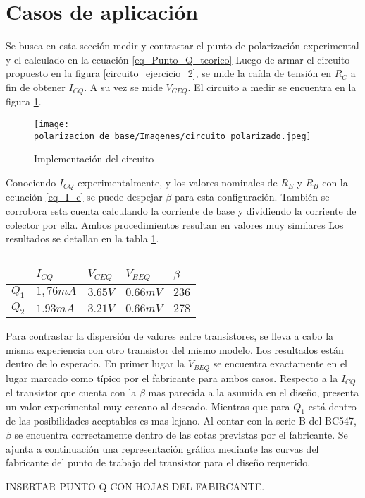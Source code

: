 \section{Casos de aplicación}

Se busca en esta sección medir y contrastar el punto de polarización experimental y el calculado en la ecuación \ref{eq_Punto_Q_teorico}
Luego de armar el circuito propuesto en la figura \ref{circuito_ejercicio_2}, se mide la caída de tensión en $R_C$ a fin de obtener $I_{CQ}$. A su vez se mide $V_{CEQ}$. El circuito a medir se encuentra en la figura \ref{fig_circuito_fisico}.
\begin{figure}[ht]
    \centering
    \texttt{[image: polarizacion\_de\_base/Imagenes/circuito\_polarizado.jpeg]}
    \caption{Implementación del circuito}\label{fig_circuito_fisico}
\end{figure} 


Conociendo $I_{CQ}$ experimentalmente, y los valores nominales de $R_E$ y $R_B$ con la ecuación \ref{eq_I_c} se puede despejar $\beta$ para esta configuración. También se corrobora esta cuenta calculando la corriente de base y dividiendo la corriente de colector por ella.
Ambos procedimientos resultan en valores muy similares
Los resultados se detallan en la tabla \ref{tabla_resultados_polarizacion}.

\begin{table}[ht]
    \centering
    \begin{tabular}{|l|l|l|l|l|}
    \hline
          & $I_{CQ}$  & $V_{CEQ}$ & $V_{BEQ}$ & $\beta$ \\ \hline
    $Q_1$ & $1,76 mA$ & $3.65 V$ & $0.66 mV$  & $236$   \\ \hline
    $Q_2$ & $1.93 mA$ & $3.21 V$  & $0.66 mV$ & $278$   \\ \hline
    \end{tabular}
    \caption{}\label{tabla_resultados_polarizacion}
\end{table}
Para contrastar la dispersión de valores entre transistores, se lleva a cabo la misma experiencia con otro transistor del mismo modelo.
Los resultados están dentro de lo esperado. En primer lugar la $V_{BEQ}$ se encuentra exactamente en el lugar marcado como típico por el fabricante para ambos casos.
Respecto a la $I_{CQ}$ el transistor que cuenta con la $\beta$ mas parecida a la asumida en el diseño, presenta un valor experimental muy cercano al deseado. Mientras que para $Q_1$ está dentro de las posibilidades aceptables es mas lejano. 
Al contar con la serie B del BC547, $\beta$ se encuentra correctamente dentro de las cotas previstas por el fabricante.
Se ajunta a continuación una representación gráfica mediante las curvas del fabricante del punto de trabajo del transistor para el diseño requerido.

INSERTAR PUNTO Q CON HOJAS DEL FABIRCANTE.